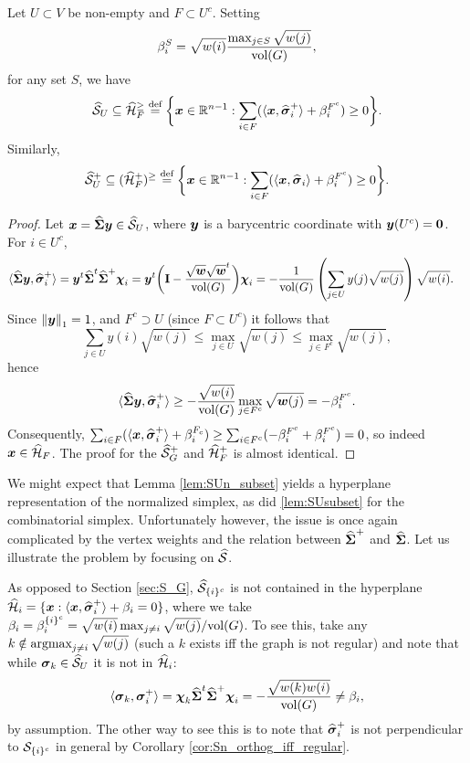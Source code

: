 \begin{lemma}
	\label{lem:SUn_subset}
	Let $U\subset V$ be non-empty and $F\subset U^c$. Setting 
	\[\beta_i^S = \sqrt{w(i)} \frac{\max_{j\in S} \sqrt{w(j)}}{\textnormal{vol}(G)},\]
	for any set $S$, we have 
	\begin{equation*}
	\widehat{\mathcal{S}}_U \subseteq \widehat{\mathcal{H}}_{F}^\geq \overset{\text{def}}{=} \bigg\{\vb*{x}\in\mathbb{R}^{n-1}: \sum_{i\in F} (\langle \vb*{x},\widehat{\vb*{\sigma}}_i^+\rangle + \beta_i^{F^c})\ge 0\bigg\}.
	\end{equation*}
	Similarly, 
	\begin{equation*}
	\widehat{\mathcal{S}}^+_U \subseteq (\widehat{\mathcal{H}}^+_{F})^\geq \overset{\text{def}}{=} \bigg\{\vb*{x}\in\mathbb{R}^{n-1}: \sum_{i\in F} (\langle \vb*{x},\widehat{\vb*{\sigma}}_i\rangle + \beta_i^{F^c})\ge 0\bigg\}.
	\end{equation*}
\end{lemma} 
\begin{proof}
	Let $\vb*{x}=\widehat{\boldsymbol{\Sigma}}\vb*{y}\in \widehat{\mathcal{S}}_U$, where $\vb*{y}$  is a barycentric coordinate with $\vb*{y}(U^c)=\vb{0}$. For $i\in U^c$, 
	\begin{align*}
	\langle \widehat{\boldsymbol{\Sigma}}\vb*{y},\widehat{\vb*{\sigma}}_i^+ \rangle &= \vb*{y}^t \widehat{\boldsymbol{\Sigma}}^t \widehat{\boldsymbol{\Sigma}}^+ \boldsymbol{\chi}_i = \vb*{y}^t \bigg(\vb{I}-\frac{\sqrt{\vb*{w}}\sqrt{\vb*{w}}^t}{\textnormal{vol}(G)}\bigg)\boldsymbol{\chi}_i = - \frac{1}{\textnormal{vol}(G)} \left(\sum_{j\in U}y(j) \sqrt{w(j)}\right) \sqrt{w(i)}.
	\end{align*}
	Since $\norm{\vb*{y}}_1=1$, and $F^c\supset U$ (since $F\subset U^c$) it follows that 
	\[\sum_{j\in U}y(i) \sqrt{w(j)} \leq \max_{j\in U} \sqrt{w(j)} \leq \max_{j\in F^c}\sqrt{w(j)},\]
	hence 
	\[\langle \widehat{\boldsymbol{\Sigma}}\vb*{y},\widehat{\vb*{\sigma}}_i^+\rangle \geq -\frac{\sqrt{w(i)}}{\textnormal{vol}(G)} \max_{j\in F^c}\sqrt{\vb*{w}(j)} = -\beta_i^{F^c}.\]  
	Consequently, $\sum_{i\in F} (\langle \vb*{x},\widehat{\vb*{\sigma}}_i^+\rangle + \beta_i^{F_c}) \geq \sum_{i\in F^c}(-\beta_i^{F^c} +\beta_i^{F^c})=0$, so indeed $\vb*{x}\in \widehat{\mathcal{H}}_F$. The proof for the $\widehat{\mathcal{S}}^+_G$ and $\widehat{\mathcal{H}}_F^+$ is almost identical. 
\end{proof}

We might expect that Lemma \ref{lem:SUn_subset} yields a hyperplane representation of the normalized simplex, as did \ref{lem:SUsubset} for the combinatorial simplex. Unfortunately however, the issue is once again complicated by the vertex weights and the relation between $\widehat{\boldsymbol{\Sigma}}^+$ and $\widehat{\boldsymbol{\Sigma}}$. Let us illustrate the problem by focusing on $\widehat{\mathcal{S}}$. 

As opposed to Section \ref{sec:S_G}, $\widehat{\mathcal{S}}_{\{i\}^c} $ is not contained in the hyperplane $\widehat{\mathcal{H}}_i = \{\vb*{x}: \langle \vb*{x},\widehat{\vb*{\sigma}}_i^+\rangle + \beta_i=0\}$, where we take $\beta_i = \beta_i^{\{i\}^c} = \sqrt{w(i)}\max_{j\neq i}\sqrt{w(j)} / \textnormal{vol}(G)$. To see this, take any $k\notin \operatorname*{\textnormal{argmax}}_{j\neq i} \sqrt{w(j)}$ (such a $k$ exists iff the graph is not regular) and note that while $\vb*{\sigma}_k\in\widehat{\mathcal{S}}_U$ it is not in $\widehat{\mathcal{H}}_i$: 
\[\langle \vb*{\sigma}_k,\vb*{\sigma}_i^+\rangle = \boldsymbol{\chi}_k\widehat{\boldsymbol{\Sigma}}^t\widehat{\boldsymbol{\Sigma}}^+\boldsymbol{\chi}_i = -\frac{\sqrt{w(k)w(i)}}{\textnormal{vol}(G)}\neq \beta_i,\]
by assumption. The other way to see this is to note that $\widehat{\vb*{\sigma}}_i^+$ is not perpendicular to $\mathcal{S}_{\{i\}^c}$ in general by Corollary \ref{cor:Sn_orthog_iff_regular}. 



